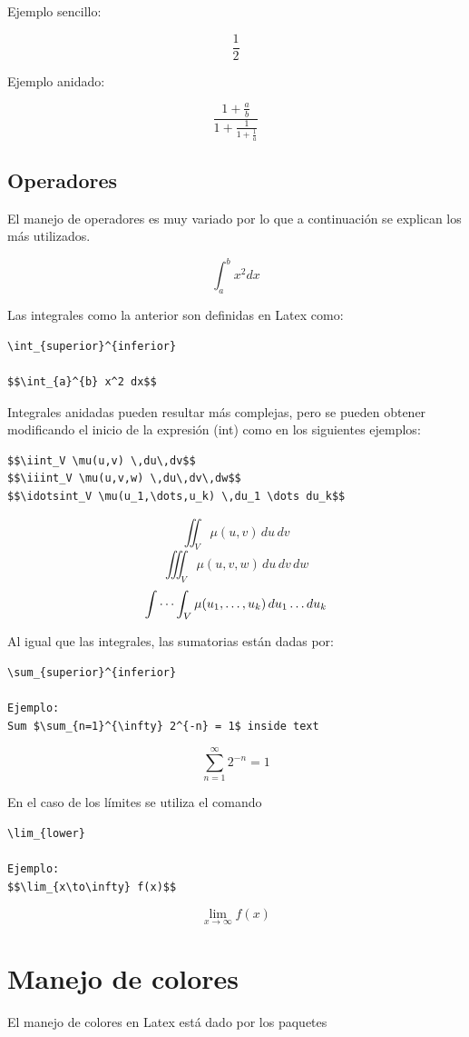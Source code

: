 \documentclass[letterpaper, 10pt, journal]{IEEEtran}
\begin{document}
Ejemplo sencillo:

$$\frac{1}{2}$$

Ejemplo anidado:
 
$$ \frac{1+\frac{a}{b}}{1+\frac{1}{1+\frac{1}{a}}} $$
 
\subsection{Operadores}
El manejo de operadores es muy variado por lo que a continuaci\'{o}n se explican los m\'{a}s utilizados.

$$\int_{a}^{b} x^2 dx$$

Las integrales como la anterior son definidas en Latex como:

\begin{lstlisting}
\int_{superior}^{inferior}

$$\int_{a}^{b} x^2 dx$$
\end{lstlisting}

Integrales anidadas pueden resultar más complejas, pero se pueden obtener modificando el inicio de la expresión (int) como en los siguientes ejemplos:
\begin{lstlisting}
$$\iint_V \mu(u,v) \,du\,dv$$
$$\iiint_V \mu(u,v,w) \,du\,dv\,dw$$
$$\idotsint_V \mu(u_1,\dots,u_k) \,du_1 \dots du_k$$
\end{lstlisting}

$$\iint_V \mu(u,v) \,du\,dv$$
$$\iiint_V \mu(u,v,w) \,du\,dv\,dw$$
$$\idotsint_V \mu(u_1,\dots,u_k) \,du_1 \dots du_k$$

Al igual que las integrales, las sumatorias est\'{a}n dadas por:
\begin{lstlisting}
\sum_{superior}^{inferior}

Ejemplo:
Sum $\sum_{n=1}^{\infty} 2^{-n} = 1$ inside text
\end{lstlisting}

$$\sum_{n=1}^{\infty} 2^{-n} = 1$$

En el caso de los l\'{i}mites se utiliza el comando

\begin{lstlisting}
\lim_{lower}

Ejemplo:
$$\lim_{x\to\infty} f(x)$$
\end{lstlisting}

$$\lim_{x\to\infty} f(x)$$

\section{Manejo de colores}
El manejo de colores en Latex est\'{a} dado por los paquetes
\end{document}
